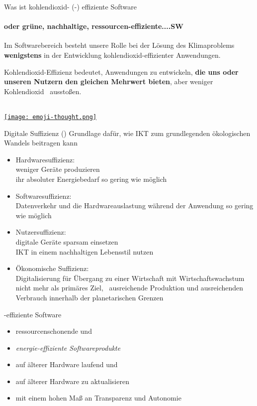 \begin{frame}{Was ist kohlendioxid- (\COz-) effiziente Software}
	\framesubtitle{\hspace*{\fill}oder grüne, nachhaltige, ressourcen-effiziente....SW}
	\begin{block}{}
	Im Softwarebereich besteht unsere Rolle bei der Lösung des Klimaproblems \textbf<2->{wenigstens} 
	in der Entwicklung kohlendioxid-effizienter Anwendungen. 
	
	Kohlendioxid-Effizienz bedeutet, Anwendungen zu entwickeln,\textbf<2->{ die uns oder unseren  
	Nutzern den gleichen Mehrwert bieten}, aber weniger Kohlendioxid \COz \ ausstoßen.
	\end{block}\pause 
	~\\[-10mm]\hspace*{\fill}
	\href{https://www.freepngimg.com/png/77530-emoticon-thinking-thought-world-whatsapp-day-emoji}{%
	\texttt{[image: emoji-thought.png]}}\label{fig.emoji}
\end{frame}

\begin{frame}{Digitale Suffizienz (\cite{santarius_digital_2023})} 
Grundlage dafür,  wie IKT zum  grundlegenden ökologischen Wandels beitragen kann 
\begin{itemize}[<+->]
	\item Hardwaresuffizienz: \\
	   weniger Geräte produzieren \\
		ihr absoluter Energiebedarf so gering wie möglich
  \item  Softwaresuffizienz:\\
	   Datenverkehr und die Hardwareauslastung während der Anwendung so gering wie möglich
 \item Nutzersuffizienz:\\
      digitale Geräte sparsam einsetzen \\
			IKT in einem nachhaltigen Lebensstil nutzen
\item Ökonomische Suffizienz:\\
    Digitalisierung für  Übergang zu einer Wirtschaft mit
		Wirtschaftswachstum nicht mehr als primäres Ziel, \
		ausreichende Produktion und ausreichenden Verbrauch innerhalb der planetarischen Grenzen
\end{itemize}

\end{frame}

\begin{frame}{\COz-effiziente Software}

\begin{itemize}
	\item ressourcenschonende und 
	\item \emph{energie-effiziente Softwareprodukte}
	\item auf älterer Hardware laufend und 
	\item  auf älterer Hardware  zu aktualisieren
	\item mit einem hohen Maß an Transparenz und Autonomie
\end{itemize}

\end{frame}


